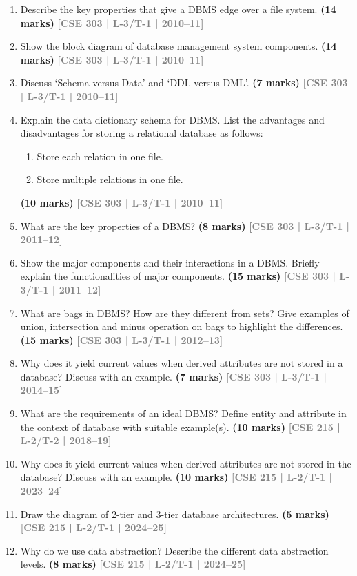 \documentclass[12pt,a3paper]{article}
\newcommand{\yr}[1]{\hfill\textcolor{gray}{\small\textbf{[#1]}}}
\newcommand{\mk}[1]{\textcolor{orange!70!black}{\small\textbf{(#1 marks)}}}
\begin{document}
\begin{enumerate}

\item Describe the key properties that give a DBMS edge over a file system.
\mk{14} \yr{CSE 303 | L-3/T-1 | 2010--11}

\item Show the block diagram of database management system components.
\mk{14} \yr{CSE 303 | L-3/T-1 | 2010--11}

\item Discuss `Schema versus Data' and `DDL versus DML'.
\mk{7} \yr{CSE 303 | L-3/T-1 | 2010--11}

\item Explain the data dictionary schema for DBMS. List the advantages and disadvantages for storing a relational database as follows:
\begin{enumerate}
  \item Store each relation in one file.
  \item Store multiple relations in one file.
\end{enumerate}
\mk{10} \yr{CSE 303 | L-3/T-1 | 2010--11}

\item What are the key properties of a DBMS?
\mk{8} \yr{CSE 303 | L-3/T-1 | 2011--12}

\item Show the major components and their interactions in a DBMS. Briefly explain the functionalities of major components.
\mk{15} \yr{CSE 303 | L-3/T-1 | 2011--12}

\item What are bags in DBMS? How are they different from sets? Give examples of union, intersection and minus operation on bags to highlight the differences.
\mk{15} \yr{CSE 303 | L-3/T-1 | 2012--13}

\item Why does it yield current values when derived attributes are not stored in a database? Discuss with an example.
\mk{7} \yr{CSE 303 | L-3/T-1 | 2014--15}

\item What are the requirements of an ideal DBMS? Define entity and attribute in the context of database with suitable example(s).
\mk{10} \yr{CSE 215 | L-2/T-2 | 2018--19}

\item Why does it yield current values when derived attributes are not stored in the database? Discuss with an example.
\mk{10} \yr{CSE 215 | L-2/T-1 | 2023--24}

\item Draw the diagram of 2-tier and 3-tier database architectures.
\mk{5} \yr{CSE 215 | L-2/T-1 | 2024--25}

\item Why do we use data abstraction? Describe the different data abstraction levels.
\mk{8} \yr{CSE 215 | L-2/T-1 | 2024--25}

\end{enumerate}
\end{document}
